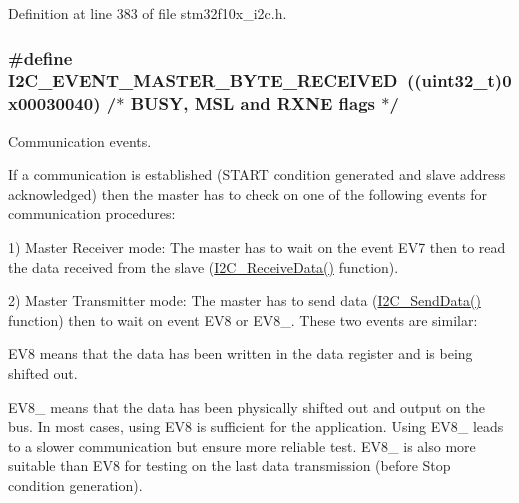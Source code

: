 Definition at line 383 of file stm32f10x\+\_\+i2c.\+h.

\subsubsection[{\texorpdfstring{I2\+C\+\_\+\+E\+V\+E\+N\+T\+\_\+\+M\+A\+S\+T\+E\+R\+\_\+\+B\+Y\+T\+E\+\_\+\+R\+E\+C\+E\+I\+V\+ED}{I2C_EVENT_MASTER_BYTE_RECEIVED}}]{\setlength{\rightskip}{0pt plus 5cm}\#define I2\+C\+\_\+\+E\+V\+E\+N\+T\+\_\+\+M\+A\+S\+T\+E\+R\+\_\+\+B\+Y\+T\+E\+\_\+\+R\+E\+C\+E\+I\+V\+ED~(({\bf uint32\+\_\+t})0x00030040)  /$\ast$ B\+U\+S\+Y, M\+S\+L and R\+X\+N\+E flags $\ast$/}\hypertarget{group___i2_c___events_ga6bcf2ae49961e07e27cf9fdf334719e3}{}\label{group___i2_c___events_ga6bcf2ae49961e07e27cf9fdf334719e3}


Communication events. 

If a communication is established (S\+T\+A\+RT condition generated and slave address acknowledged) then the master has to check on one of the following events for communication procedures\+:

1) Master Receiver mode\+: The master has to wait on the event E\+V7 then to read the data received from the slave (\hyperlink{group___i2_c___private___functions_gaeaaa4b6f77f50eb57465148c55d27fb2}{I2\+C\+\_\+\+Receive\+Data()} function).

2) Master Transmitter mode\+: The master has to send data (\hyperlink{group___i2_c___private___functions_ga7bd9e70b8eafde0dd5eb42b0d95fe1a9}{I2\+C\+\_\+\+Send\+Data()} function) then to wait on event E\+V8 or E\+V8\+\_. These two events are similar\+:
\begin{DoxyItemize}
\item E\+V8 means that the data has been written in the data register and is being shifted out.
\item E\+V8\+\_ means that the data has been physically shifted out and output on the bus. In most cases, using E\+V8 is sufficient for the application. Using E\+V8\+\_ leads to a slower communication but ensure more reliable test. E\+V8\+\_ is also more suitable than E\+V8 for testing on the last data transmission (before Stop condition generation).
\end{DoxyItemize}

